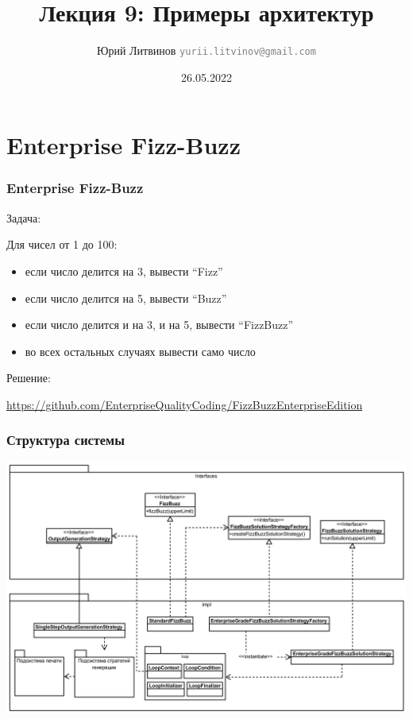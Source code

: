 \documentclass[xetex,mathserif,serif]{beamer}
\title{Лекция 9: Примеры архитектур}
\author[Юрий Литвинов]{Юрий Литвинов \newline \textcolor{gray}{\small\texttt{yurii.litvinov@gmail.com}}}
\date{26.05.2022}
\begin{document}
    \frame{\titlepage}
    \section{Enterprise Fizz-Buzz}

    \begin{frame}
        \frametitle{Enterprise Fizz-Buzz}
        Задача:

        Для чисел от 1 до 100:
        \begin{itemize}
            \item если число делится на 3, вывести ``Fizz''
            \item если число делится на 5, вывести ``Buzz''
            \item если число делится и на 3, и на 5, вывести ``FizzBuzz''
            \item во всех остальных случаях вывести само число
        \end{itemize}

        Решение:

        \url{https://github.com/EnterpriseQualityCoding/FizzBuzzEnterpriseEdition}
    \end{frame}

    \begin{frame}
        \frametitle{Структура системы}
        \begin{center}
            \includegraphics[width=\textwidth]{fizzBuzzArchitecture.png}
        \end{center}
    \end{frame}
\end{document}
